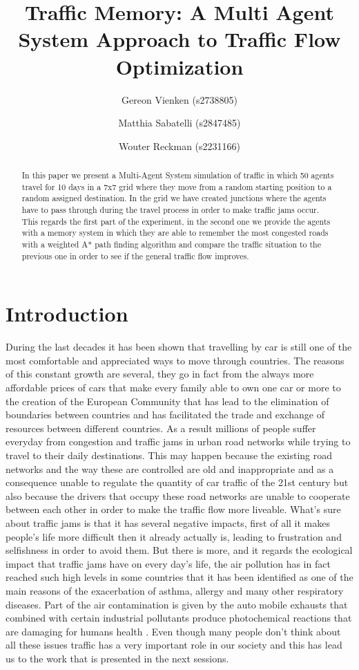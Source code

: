 \documentclass[a4paper,hidelinks]{article}
\title{\textbf{\huge Traffic Memory: A Multi Agent System Approach to Traffic Flow Optimization}%
}
\author{
	Gereon Vienken (s2738805) \and
    Matthia Sabatelli (s2847485) \and
    Wouter Reckman (s2231166)
}
\date{}
\begin{document}
\ttl
\thispagestyle{empty}

%


\begin{abstract}
\noindent
In this paper we present a Multi-Agent System simulation of traffic in which 50 agents travel for 10 days in a 7x7 grid where they move from a random starting position to a random assigned destination. In the grid we have created junctions where the agents have to pass through during the travel process in order to make traffic jams occur. This regards the first part of the experiment, in the second one we provide the agents with a memory system in which they are able to remember the most congested roads with a weighted A* path finding algorithm and compare the traffic situation to the previous one in order to see if the general traffic flow improves. 
\end{abstract}


\section{Introduction}
During the last decades it has been shown that travelling by car is still one of the most comfortable and appreciated ways to move through countries. The reasons of this constant growth are several, they go in fact from the always more affordable prices of cars that make every family able to own one car or more to the creation of the European Community that has lead to the elimination of boundaries between countries and has facilitated the trade and exchange of resources between different countries. As a result millions of people suffer everyday from congestion and traffic jams in urban road networks while trying to travel to their daily destinations. This may happen because the existing road networks and the way these are controlled are old and inappropriate and as a consequence unable to regulate the quantity of car traffic of the 21st century but also because the drivers that occupy these road networks are unable to cooperate between each other in order to make the traffic flow more liveable. What's sure about traffic jams is that it has several negative impacts, first of all it makes people's life more difficult then it already actually is, leading to frustration and selfishness in order to avoid them. But there is more, and it regards the ecological impact that traffic jams have on every day's life, the air pollution has in fact reached such high levels in some countries that it has been identified as one of the main reasons of the exacerbation of asthma, allergy and many other respiratory diseases. Part of the air contamination is given by the auto mobile exhausts that combined with certain industrial pollutants produce photochemical reactions that are damaging for humans health \cite{ghose2005assessment}. Even though many people don't think about all these issues traffic has a very important role in our society and this has lead us to the work that is presented in the next sessions.             
\end{document}
